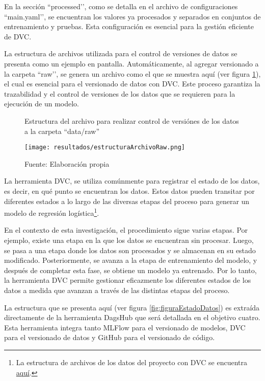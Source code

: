 En la sección ``processed’’, como se detalla en el archivo de configuraciones ``main.yaml’’, se encuentran los valores ya procesados y separados en conjuntos de entrenamiento y pruebas. Esta configuración es esencial para la gestión eficiente de DVC.

La estructura de archivos utilizada para el control de versiones de datos se presenta como un ejemplo en pantalla. Automáticamente, al agregar versionado a la carpeta ``raw’’, se genera un archivo como el que se muestra aquí (ver figura \ref{fig:figuraEstructuraArchivoRaw}), el cual es esencial para el versionado de datos con DVC. Este proceso garantiza la trazabilidad y el control de versiones de los datos que se requieren para la ejecución de un modelo.

\newpage

\begin{figure}[h]
\centering
\caption{Estructura del archivo para realizar control de versiónes de los datos a la carpeta ``data/raw''}
\texttt{[image: resultados/estructuraArchivoRaw.png]}
\caption*{\footnotesize Fuente: Elaboración propia}
\label{fig:figuraEstructuraArchivoRaw}
\end{figure}

La herramienta DVC, se utiliza comúnmente para registrar el estado de los datos, es decir, en qué punto se encuentran los datos. Estos datos pueden transitar por diferentes estados a lo largo de las diversas etapas del proceso para generar un modelo de regresión logística\footnote{La estructura de archivos de los datos del proyecto con DVC se encuentra \href{https://github.com/juferoto/mlops_project/blob/master/dvc.yaml}{aquí}.}.

En el contexto de esta investigación, el procedimiento sigue varias etapas. Por ejemplo, existe una etapa en la que los datos se encuentran sin procesar. Luego, se pasa a una etapa donde los datos son procesados y se almacenan en su estado modificado. Posteriormente, se avanza a la etapa de entrenamiento del modelo, y después de completar esta fase, se obtiene un modelo ya entrenado. Por lo tanto, la herramienta DVC permite gestionar eficazmente los diferentes estados de los datos a medida que avanzan a través de las distintas etapas del proceso.

\newpage

La estructura que se presenta aquí (ver figura \ref{fig:figuraEstadoDatos}) es extraída directamente de la herramienta DagsHub que será detallada en el objetivo cuatro. Esta herramienta integra tanto MLFlow para el versionado de modelos, DVC para el versionado de datos y GitHub para el versionado de código.
\newline

